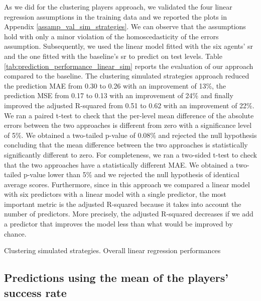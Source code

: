 As we did for the clustering players approach, we validated the four linear regression assumptions in the training data and we reported the plots in Appendix \ref{assamp_val_sim_strategies}. We can observe that the assumptions hold with only a minor violation of the homoscedasticity of the errors assumption. 
Subsequently, we used the linear model fitted with the six agents' \acs{sr} and the one fitted with the baseline's \acs{sr} to predict on test levels. Table \ref{tab:prediction_performance_linear_sim} reports the evaluation of our approach compared to the baseline. The clustering simulated strategies approach reduced the prediction MAE from 0.30 to 0.26 with an improvement of 13\%, the prediction MSE from 0.17 to 0.13 with an improvement of 24\% and finally improved the adjusted R-squared from 0.51 to 0.62 with an improvement of 22\%. 
We ran a paired t-test to check that the per-level mean difference of the absolute errors between the two approaches is different from zero with a significance level of 5\%. We obtained a two-tailed p-value of 0.08\% and rejected the null hypothesis concluding that the mean difference between the two approaches is statistically significantly different to zero.
For completeness, we ran a two-sided t-test to check that the two approaches have a statistically different \acs{MAE}. We obtained a two-tailed p-value lower than 5\% and we rejected the null hypothesis of identical average scores. Furthermore, since in this approach we compared a linear model with six predictors with a linear model with a single predictor, the most important metric is the adjusted R-squared because it takes into account the number of predictors. More precisely, the adjusted R-squared decreases if we add a predictor that improves the model less than what would be improved by chance.  
\begin{table}[h!]
    \centering
    \small
    \caption{Clustering simulated strategies. Overall linear regression performances} 
    
    \label{tab:prediction_performance_linear_sim}
\end{table} 


\subsection*{Predictions using the mean of the players’ success rate}

